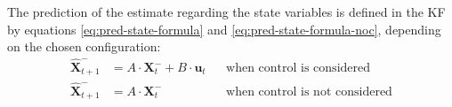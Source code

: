 
The prediction of the estimate regarding the state variables is defined in the \gls{KF} by equations \eqref{eq:pred-state-formula} and \eqref{eq:pred-state-formula-noc}, depending on the chosen configuration:
	\begin{align}
		\label{eq:pred-state-formula}
		\hat{\mathbf{X}}_{t+1}^-& = A \cdot \mathbf{X}_t^- + B \cdot \mathbf{u}_t && \text{when control is considered} \\
		\label{eq:pred-state-formula-noc}
		\hat{\mathbf{X}}_{t+1}^- & = A \cdot \mathbf{X}_t^- &&       \text{when control is not considered} 
	\end{align}



